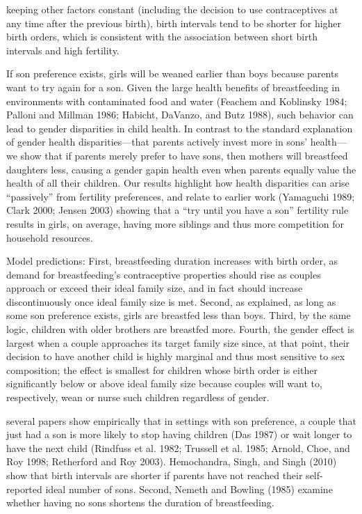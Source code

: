 keeping other factors constant (including the decision to use
contraceptives at any time after the previous birth), birth intervals
tend to be shorter for higher birth orders, which is consistent with the
association between short birth intervals and high fertility.

\citep{Jayachandran2011}

If son preference exists, girls will be weaned earlier than boys because
parents want to try again for a son. Given the large health benefits of
breastfeeding in environments with contaminated food and water (Feachem
and Koblinsky 1984; Palloni and Millman 1986; Habicht, DaVanzo, and Butz
1988), such behavior can lead to gender disparities in child health. In contrast
to the standard explanation of gender health disparities—that parents
actively invest more in sons’ health—we show that if parents merely
prefer to have sons, then mothers will breastfeed daughters less,
causing a gender gapin health even when parents
equally value the health of all their children. Our results highlight how
health disparities can arise “passively” from fertility preferences, and
relate to earlier work (Yamaguchi 1989; Clark 2000; Jensen 2003) showing
that a “try until you have a son” fertility rule results in girls, on
average, having more siblings and thus more competition for household
resources.

Model predictions:
First, breastfeeding duration increases with birth order, as demand for
breastfeeding’s contraceptive properties should rise as couples approach
or exceed their ideal family size, and in fact should increase
discontinuously once ideal family size is met.
Second, as explained, as long as some son preference exists, girls are
breastfed less than boys.
Third, by the same logic, children with older brothers are breastfed
more.
Fourth, the gender effect is largest when a couple approaches its target
family size since, at that point, their decision to have another child
is highly marginal and thus most sensitive to sex composition; the
effect is smallest for children whose birth order is either
significantly below or above ideal family size because couples will want
to, respectively, wean or nurse such children regardless of gender.

several papers show empirically that in settings with son preference, a
couple that just had a son is more likely to stop having children (Das
1987) or wait longer to have the next child (Rindfuss et al. 1982;
Trussell et al. 1985; Arnold, Choe, and Roy 1998; Retherford and Roy
2003). Hemochandra, Singh, and Singh (2010) show that birth intervals
are shorter if parents have not reached their self-reported ideal number
of sons. Second, Nemeth and Bowling (1985) examine whether having no
sons
shortens the duration of breastfeeding.

